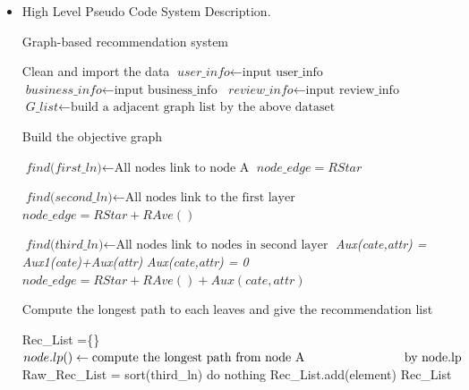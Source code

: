 \begin{itemize}
\item{ High Level Pseudo Code System Description. }
\begin{algorithm}
\caption{Graph-based recommendation system}\label{algo-pseudo}
\begin{algorithmic}
\State Clean and import the data
    \State $\textit{user\_info} \gets \text{input user\_info}$
    \State $\textit{business\_info} \gets \text{input business\_info}$
    \State $\textit{review\_info} \gets \text{input review\_info}$
    \State $\textit{G\_list} \gets \text{build a adjacent graph list by the above dataset}$
\EndProcedure

\Statex

\State Build the objective graph

\State $\textit{find(first\_ln)} \gets \text{All nodes link to node A}$
          \State $node\_edge = RStar$ %
    \EndFor
\EndProcedure

\State $\textit{find(second\_ln)} \gets \text{All nodes link to the first layer}$
          \State $node\_edge = RStar + RAve()$ %
    \EndFor
\EndProcedure

\State $\textit{find(third\_ln)} \gets \text{All nodes link to nodes in second layer}$
                \State \textit{Aux(cate,attr) = Aux1(cate)+Aux(attr)}
         \Else
                \State \textit{Aux(cate,attr) = 0}
         \EndIf
    \EndFor                  
          \State $node\_edge = RStar + RAve()+ Aux(cate,attr)$ %
    \EndFor
\EndProcedure

\Statex
\State Compute the longest path to each leaves and give the recommendation list

    \State Rec\_List =\{\}
         \State $node.lp() \gets \text{compute the longest path from node A} \hfill \break
         \text{\ \ \ \ \ \ \ \ \ \ \ \ \ \ \ \  \ \ \ \  \ \ \ \ by node.lp}$
    \EndFor
    Raw\_Rec\_List = sort(third\_ln) 
                 \State do nothing
         \Else
                 \State Rec\_List.add(element)
         \EndIf
   \EndFor
\Return Rec\_List
\EndProcedure



\end{algorithmic}
\end{algorithm}
\end{itemize}
